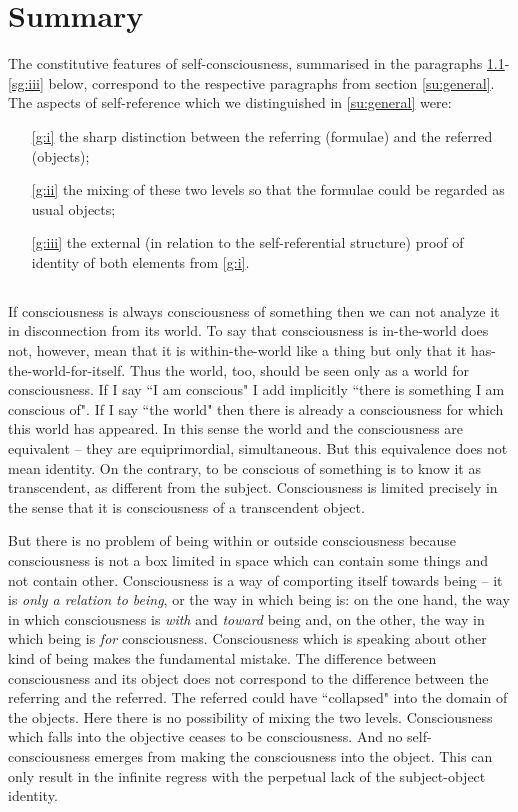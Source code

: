 \section{Summary}\label{se:sum}
The constitutive features of self-consciousness, summarised in the paragraphs \ref{sg:i}-\ref{sg:iii} below, correspond to the respective paragraphs from section \ref{su:general}.
The aspects of self-reference which we distinguished in \ref{su:general} were:
\begin{itemize}
\item[\ref{g:i}]  the sharp distinction between the referring (formulae) and the referred (objects);
\item[\ref{g:ii}]  the mixing of these two levels so that the formulae could be regarded as usual objects;
\item[\ref{g:iii}]  the external (in relation to the self-referential structure) proof of identity of both elements from \ref{g:i}.
\end{itemize}

\subsection{}\label{sg:i}
 If consciousness is always consciousness of something then we can not analyze it in disconnection from its 
world. To say that consciousness is in-the-world does not, however, mean that it is within-the-world like a thing 
but only that it has-the-world-for-itself. Thus the world, too, should be seen only as a world for consciousness. If I 
say ``I am conscious" I add implicitly ``there is something I am conscious of". If I say ``the world" then there is 
already a consciousness for which this world has appeared. In this sense the world and the consciousness are 
equivalent -- they are equiprimordial, simultaneous. But this equivalence does not mean identity. On the contrary, to 
be conscious of something is to know it as transcendent, as different from the subject. Consciousness is limited 
precisely in the sense that it is consciousness of a transcendent object.

But there is no problem of being within or outside consciousness because consciousness is not a box limited in 
space which can contain some things and not contain other. Consciousness is a way of comporting itself towards 
being -- it is {\em only a relation to being}, or the way in which being is: on the one hand, the way in which 
consciousness is {\em with} and {\em toward} being and, on the other, the way in which being is {\em for} consciousness. 
Consciousness which is speaking about other kind of being makes the fundamental mistake. The difference 
between consciousness and its object does not correspond to the difference between the referring and the referred. 
The referred could have ``collapsed" into the domain of the objects. Here there is no possibility of mixing the two 
levels. Consciousness which falls into the objective ceases to be consciousness. And no self-consciousness 
emerges from making the consciousness into the object. This can only result in the infinite regress with the 
perpetual lack of the subject-object identity.

